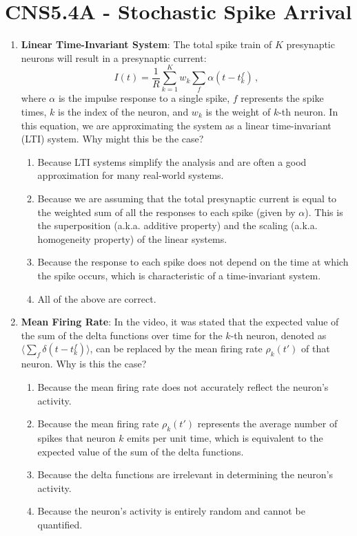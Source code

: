 \documentclass[11pt,letterpaper]{article}
\begin{document}
\section{CNS5.4A - Stochastic Spike Arrival}
\begin{enumerate}
    \item \textbf{Linear Time-Invariant System}: The total spike train of $K$ presynaptic neurons will result in a presynaptic current:
    \begin{equation}
        I(t) = \frac{1}{R} \sum_{k=1}^K w_k \sum_{f} \alpha (t - t_k^f)\, ,
    \end{equation}
    where $\alpha$ is the impulse response to a single spike, $f$ represents the spike times, $k$ is the index of the neuron, and $w_k$ is the weight of $k$-th neuron. In this equation, we are approximating the system as a linear time-invariant (LTI) system. Why might this be the case?
    \begin{enumerate}
        \item Because LTI systems simplify the analysis and are often a good approximation for many real-world systems.
        \item Because we are assuming that the total presynaptic current is equal to the weighted sum of all the responses to each spike (given by $\alpha$). This is the superposition (a.k.a. additive property) and the scaling (a.k.a. homogeneity property) of the linear systems.
        \item Because the response to each spike does not depend on the time at which the spike occurs, which is characteristic of a time-invariant system.
        \item All of the above are correct.
    \end{enumerate}

    \item \textbf{Mean Firing Rate}: In the video, it was stated that the expected value of the sum of the delta functions over time for the $k$-th neuron, denoted as $\langle\sum_f \delta(t - t_k^f)\rangle$, can be replaced by the mean firing rate $\rho_k(t')$ of that neuron. Why is this the case?
    \begin{enumerate}
        \item Because the mean firing rate does not accurately reflect the neuron's activity.
        \item Because the mean firing rate $\rho_k(t')$ represents the average number of spikes that neuron $k$ emits per unit time, which is equivalent to the expected value of the sum of the delta functions.
        \item Because the delta functions are irrelevant in determining the neuron's activity.
        \item Because the neuron's activity is entirely random and cannot be quantified.
    \end{enumerate}
    
\end{enumerate}
\pagebreak
\end{document}
